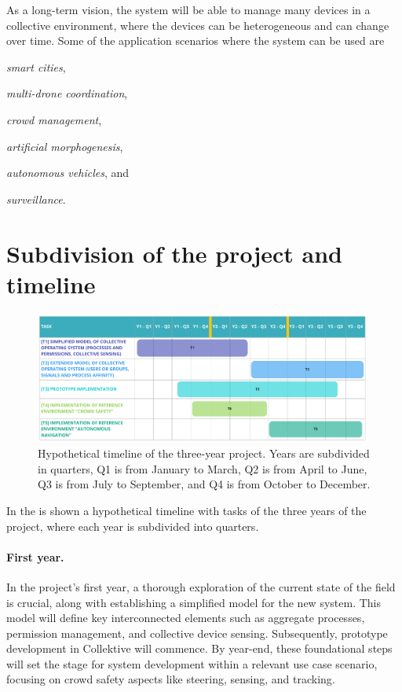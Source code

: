 \documentclass[12pt, a4paper]{article}
\newenvironment{inlinelist}{\begin{enumerate*}[label=\emph{(\roman*)}]}{\end{enumerate*}}
\begin{document}
As a long-term vision,
the system will be able to manage many devices in a collective environment,
where the devices can be heterogeneous and can change over time.
%
Some of the application scenarios where the system can be used are
\begin{inlinelist}
    \item \emph{smart cities},
    \item \emph{multi-drone coordination},
    \item \emph{crowd management},
    \item \emph{artificial morphogenesis},
    \item \emph{autonomous vehicles}, and
    \item \emph{surveillance}.
\end{inlinelist}

\section{Subdivision of the project and timeline}
\label{sec:subdivision-of-the-project-and-timeline}

\begin{figure}
    \centering
    \includegraphics[width=0.99\textwidth]{figures/timeline}
    \caption{Hypothetical timeline of the three-year project.
        Years are subdivided in quarters, Q1 is from January to March,
        Q2 is from April to June, Q3 is from July to September, and Q4 is from October to December.
    }\label{fig:timeline}
\end{figure}

In the  is shown a hypothetical timeline with tasks of the three years of the project,
where each year is subdivided into quarters.

\sloppypar
\paragraph{First year.}
In the project's first year,
a thorough exploration of the current state of the field is crucial,
along with establishing a simplified model for the new system.
%
This model will define key interconnected elements such as aggregate processes,
permission management, and collective device sensing.
%
Subsequently,
prototype development in Collektive will commence.
%
By year-end,
these foundational steps will set the stage for system development within a relevant use case scenario,
focusing on crowd safety aspects like steering, sensing, and tracking.
\end{document}
